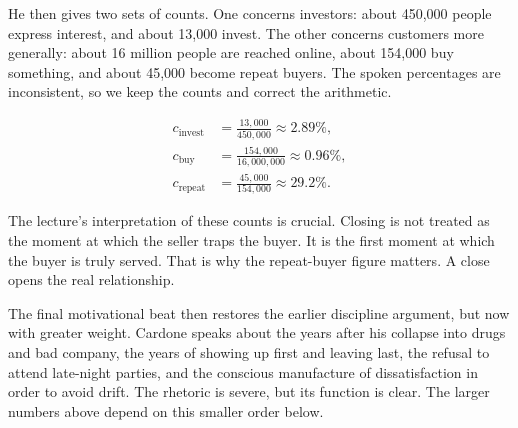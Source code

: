 He then gives two sets of counts. One concerns investors: about 450,000 people express interest, and about 13,000 invest. The other concerns customers more generally: about 16 million people are reached online, about 154,000 buy something, and about 45,000 become repeat buyers. The spoken percentages are inconsistent, so we keep the counts and correct the arithmetic.

\begin{align}
c_{\text{invest}} &= \frac{13{,}000}{450{,}000} \approx 2.89\%,\\
c_{\text{buy}} &= \frac{154{,}000}{16{,}000{,}000} \approx 0.96\%,\\
c_{\text{repeat}} &= \frac{45{,}000}{154{,}000} \approx 29.2\%.
\end{align}

\begin{figure}[h]
\centering
{}
\end{figure}

The lecture's interpretation of these counts is crucial. Closing is not treated as the moment at which the seller traps the buyer. It is the first moment at which the buyer is truly served. That is why the repeat-buyer figure matters. A close opens the real relationship.

The final motivational beat then restores the earlier discipline argument, but now with greater weight. Cardone speaks about the years after his collapse into drugs and bad company, the years of showing up first and leaving last, the refusal to attend late-night parties, and the conscious manufacture of dissatisfaction in order to avoid drift. The rhetoric is severe, but its function is clear. The larger numbers above depend on this smaller order below.

